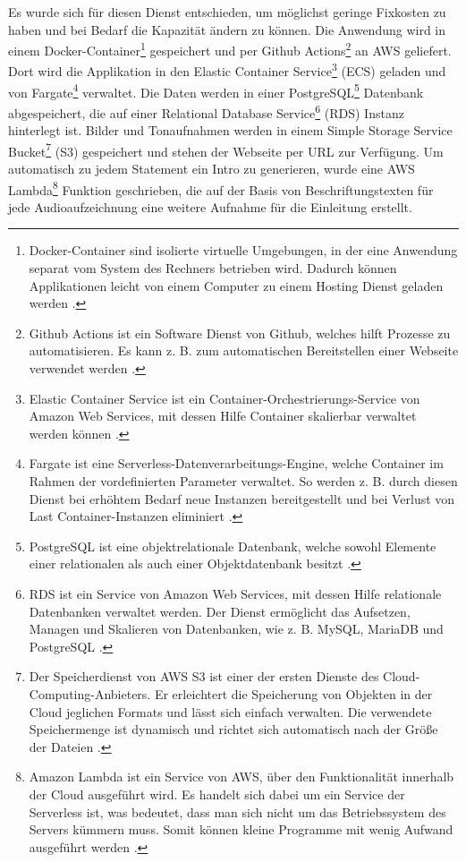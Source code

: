Es wurde sich für diesen Dienst entschieden, um möglichst geringe Fixkosten zu haben und bei Bedarf die Kapazität ändern zu können. Die Anwendung wird in einem Docker-Container\footnote{Docker-Container sind isolierte virtuelle Umgebungen, in der eine Anwendung separat vom System des Rechners betrieben wird. Dadurch können Applikationen leicht von einem Computer zu einem Hosting Dienst geladen werden \parencite{docker_container}.} gespeichert und per Github Actions\footnote{Github Actions ist ein Software Dienst von Github, welches hilft Prozesse zu automatisieren. Es kann z. B. zum automatischen Bereitstellen einer Webseite verwendet werden \parencite{github_actions}.} an AWS geliefert. Dort wird die Applikation in den Elastic Container Service\footnote{Elastic Container Service ist ein Container-Orchestrierungs-Service von Amazon Web Services, mit dessen Hilfe Container skalierbar verwaltet werden können \parencite{aws_ecs}.} (ECS) geladen und von Fargate\footnote{Fargate ist eine Serverless-Datenverarbeitungs-Engine, welche Container im Rahmen der vordefinierten Parameter verwaltet. So werden z. B. durch diesen Dienst bei erhöhtem Bedarf neue Instanzen bereitgestellt und bei Verlust von Last Container-Instanzen eliminiert \parencite{aws_fargate}.} verwaltet. 
Die Daten werden in einer PostgreSQL\footnote{PostgreSQL ist eine objektrelationale Datenbank, welche sowohl Elemente einer relationalen als auch einer Objektdatenbank besitzt \parencite{postgresql}.} Datenbank abgespeichert, die auf einer Relational Database Service\footnote{RDS ist ein Service von Amazon Web Services, mit dessen Hilfe relationale Datenbanken verwaltet werden. Der Dienst ermöglicht das Aufsetzen, Managen und Skalieren von Datenbanken, wie z. B. MySQL, MariaDB und PostgreSQL \parencite[vgl.][S.161 f.]{baron_aws_2016}.} (RDS) Instanz hinterlegt ist. 
Bilder und Tonaufnahmen werden in einem Simple Storage Service Bucket\footnote{Der Speicherdienst von AWS S3 ist einer der ersten Dienste des Cloud-Computing-Anbieters. Er erleichtert die Speicherung von Objekten in der Cloud jeglichen Formats und lässt sich einfach verwalten. Die verwendete Speichermenge ist dynamisch und richtet sich automatisch nach der Größe der Dateien \parencite[vgl.][S. 23]{baron_aws_2016}.} (S3) gespeichert und stehen der Webseite per URL zur Verfügung. 
Um automatisch zu jedem Statement ein Intro zu generieren, wurde eine AWS Lambda\footnote{Amazon Lambda ist ein Service von AWS, über den Funktionalität innerhalb der Cloud ausgeführt wird. Es handelt sich dabei um ein Service der Serverless ist, was bedeutet, dass man sich nicht um das Betriebssystem des Servers kümmern muss. Somit können kleine Programme mit wenig Aufwand ausgeführt werden \parencites[vgl.][Kap. 15.3]{wolff_microservices_2018}{aws_lambda}.} Funktion geschrieben, die auf der Basis von Beschriftungstexten für jede Audioaufzeichnung eine weitere Aufnahme für die Einleitung erstellt.


